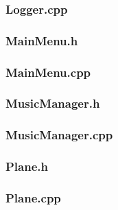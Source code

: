\documentclass{article}
\begin{document}
\subsubsection{Logger.cpp}
	
	 				
\subsubsection{MainMenu.h}
	

\subsubsection{MainMenu.cpp}
		 
 				
\subsubsection{MusicManager.h}
	
	 				
\subsubsection{MusicManager.cpp}
	
	 				
\subsubsection{Plane.h}
	
	 				
\subsubsection{Plane.cpp}
	
	 			
\end{document}
